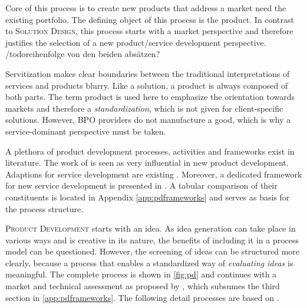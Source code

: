 	Core of this process is to create new products that address a market need \wrt the existing portfolio. The defining object of this process is the product. In contrast to \textsc{Solution Design}, this process starts with a market perspective and therefore justifies the selection of a new product/service development perspective.  /todo{reihenfolge von den beiden absätzen?}
	
	Servitization makes clear boundaries between the traditional interpretations of services and products blurry. Like a solution, a product is always composed of both parts. The term product is used here to emphasize the orientation towards markets and therefore a \textit{standardization}, which is not given for client-specific solutions. However, \acrshort{BPO} providers do not manufacture a good, which is why a service-dominant perspective must be taken.  
	
	A plethora of product development processes, activities and frameworks exist in literature. The work of  \cite{cooper1988new} is seen as very influential in new product development. Adaptions for service development are existing \citep{Edgett_1996}. Moreover, a dedicated framework for new service development is presented in \citep{cowell1988new}. A tabular comparison of their constituents is located in Appendix \ref{app:pdframeworks} and serves as basis for the process structure. 
	
	 \textsc{Product Development} starts with an idea. As idea generation can take place in various ways and is creative in its nature, the benefits of including it in a process model can be questioned. However, the screening of ideas can be structured more clearly, because a process that enables a standardized way of \textit{evaluating ideas} is meaningful. The complete process is shown in \Fig \ref{fig:pd} and continues with a market and technical assessment as proposed by \citep{Edgett_1996}, which subsumes the third section in \ref{app:pdframeworks}. The following detail processes are based on \citep{cowell1988new}. 
	
